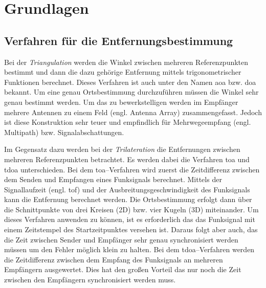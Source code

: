 \begin{comment}
------------------------------------------------------------------------------------------
\end{comment}
\chapter{Grundlagen}


\begin{comment}
------------------------------------------------------------------------------------------
- https://de.wikipedia.org/wiki/Fading_(Elektrotechnik)
\end{comment}
\section{Verfahren für die Entfernungsbestimmung}

Bei der \textit{Triangulation} werden die Winkel zwischen mehreren Referenzpunkten bestimmt und dann die dazu gehörige Entfernung mittels trigonometrischer Funktionen berechnet. Dieses Verfahren ist auch unter den Namen \Gls{aoa} bzw. \Gls{doa} bekannt. Um eine genau Ortsbestimmung durchzuführen müssen die Winkel sehr genau bestimmt werden. Um das zu bewerkstelligen werden im Empfänger mehrere Antennen zu einem Feld (engl. Antenna Array) zusammengefasst. Jedoch ist diese Konstruktion sehr teuer und empfindlich für Mehrwegeempfang (engl. Multipath) bzw. Signalabschattungen. \cite{gezici2005localization, liu2007survey, decawave2014rtls}

Im Gegensatz dazu werden bei der \textit{Trilateration} die Entfernungen zwischen mehreren Referenzpunkten betrachtet. Es werden dabei die Verfahren \Gls{toa} und \Gls{tdoa} unterschieden.
Bei dem \Gls{toa}--Verfahren wird zuerst die Zeitdifferenz zwischen dem Senden und Empfangen eines Funksignals berechnet. Mittels der Signallaufzeit (engl. \acrfull{tof}) und der Ausbreitungsgeschwindigkeit des Funksignals kann die Entfernung berechnet werden. Die Ortsbestimmung erfolgt dann über die Schnittpunkte von drei Kreisen (2D) bzw. vier Kugeln (3D) miteinander. Um dieses Verfahren anwenden zu können, ist es erforderlich das das Funksignal mit einem Zeitstempel des Startzeitpunktes versehen ist. Daraus folgt aber auch, das die Zeit zwischen Sender und Empfänger sehr genau synchronisiert werden müssen um den Fehler möglich klein zu halten.
Bei dem \Gls{tdoa}--Verfahren werden die Zeitdifferenz zwischen dem Empfang des Funksignals an mehreren Empfängern ausgewertet. Dies hat den großen Vorteil das nur noch die Zeit zwischen den Empfängern synchronisiert werden muss. \cite{zekavat2011handbook, decawave2014rtls}

